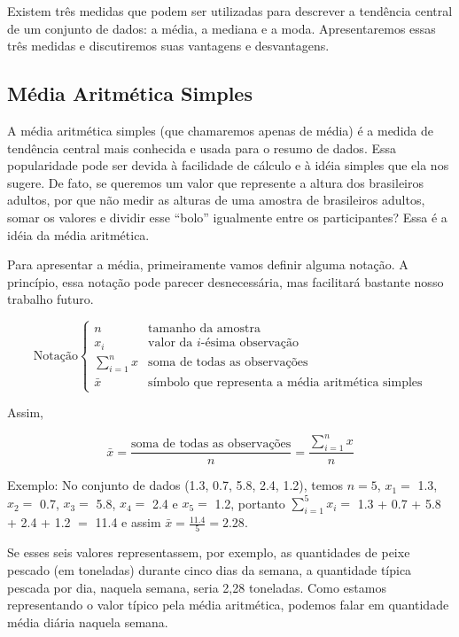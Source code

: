\documentclass[
]{book}
\begin{document}
Existem três medidas que podem ser utilizadas para descrever a tendência central de um conjunto de dados: a média, a mediana e a moda. Apresentaremos essas três medidas e discutiremos suas vantagens e desvantagens.

\hypertarget{muxe9dia-aritmuxe9tica-simples}{%
\subsection{Média Aritmética Simples}\label{muxe9dia-aritmuxe9tica-simples}}

A média aritmética simples (que chamaremos apenas de média) é a medida de tendência central mais conhecida e usada para o resumo de dados. Essa popularidade pode ser devida à facilidade de cálculo e à idéia simples que ela nos sugere. De fato, se queremos um valor que represente a altura dos brasileiros adultos, por que não medir as alturas de uma amostra de brasileiros adultos, somar os valores e dividir esse ``bolo'' igualmente entre os participantes? Essa é a idéia da média aritmética.

Para apresentar a média, primeiramente vamos definir alguma notação. A princípio, essa notação pode parecer desnecessária, mas facilitará bastante nosso trabalho futuro.

\begin{equation*}
\text{Notação} 
    \begin{cases}
      n          & \text{tamanho da amostra} \\
      x_i        & \text{valor da $i$-ésima observação} \\
      \sum_{i=1}^n x & \text{soma de todas as observações} \\
      \bar x     & \text{símbolo que representa a média aritmética simples}
    \end{cases}
\end{equation*}

Assim,

\begin{equation*}
\bar x = \frac{\text{soma de todas as observações}}{{n}} = \frac{\sum_{i=1}^n x}{n}
\end{equation*}

Exemplo: No conjunto de dados (1.3, 0.7, 5.8, 2.4, 1.2), temos \(n=5\), \(x_1=\) 1.3, \(x_2=\) 0.7, \(x_3=\) 5.8, \(x_4=\) 2.4 e \(x_5=\) 1.2, portanto \(\sum_{i=1}^5 x_i=\) 1.3 + 0.7 + 5.8 + 2.4 + 1.2 \(=\) 11.4 e assim \(\bar x = \frac{11.4}{5}=2.28\).

Se esses seis valores representassem, por exemplo, as quantidades de peixe pescado (em toneladas) durante cinco dias da semana, a quantidade típica pescada por dia, naquela semana, seria 2,28 toneladas. Como estamos representando o valor típico pela média aritmética, podemos falar em quantidade média diária naquela semana.
\end{document}
